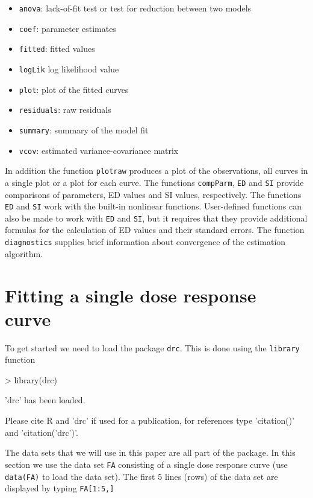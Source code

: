 \documentclass[a4paper]{article}
\begin{document}
\begin{itemize}
\item \verb+anova+: lack-of-fit test or test for reduction between two models
\item \verb+coef+: parameter estimates
\item \verb+fitted+: fitted values
\item \verb+logLik+ log likelihood value
\item \verb+plot+: plot of the fitted curves
\item \verb+residuals+: raw residuals
\item \verb+summary+: summary of the model fit
\item \verb+vcov+: estimated variance-covariance matrix
\end{itemize} 

In addition the function \verb+plotraw+ produces a plot of the observations, all curves in a single plot or a plot for each curve.
The functions \verb+compParm+, \verb+ED+ and \verb+SI+ provide comparisons of parameters, ED values and SI values, respectively. 
The functions \verb+ED+ and \verb+SI+ work with the built-in nonlinear functions. User-defined functions can also be made to work with \verb+ED+ 
and \verb+SI+, but it requires that they provide additional formulas for the calculation of ED values and their standard errors.
The function \verb+diagnostics+ supplies brief information about convergence of the estimation algorithm.




\newpage
\section{Fitting a single dose response curve} \label{sec:4}

To get started we need to load the package \verb+drc+. This is done using the \verb+library+ function

\begin{Schunk}
\begin{Sinput}
> library(drc)
\end{Sinput}
\begin{Soutput}
'drc' has been loaded.

Please cite R and 'drc' if used for a publication,
for references type 'citation()' and 'citation('drc')'.
\end{Soutput}
\end{Schunk}
The data sets that we will use in this paper are all part of the package. In this section we use the data set \verb+FA+
consisting of a single dose response curve (use \verb+data(FA)+ to load the data set). The first 5 lines (rows) of the data set are 
displayed by typing \verb+FA[1:5,]+
\end{document}
